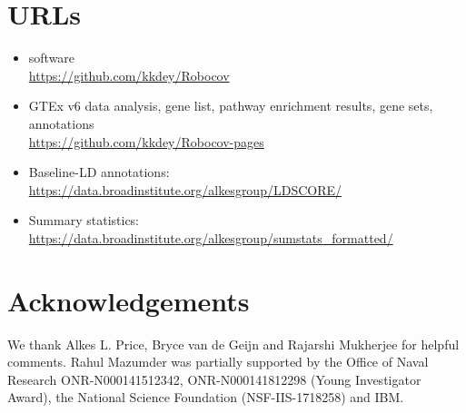 \section*{URLs}
\small
\begin{itemize}
    \item \Robocov{} software \\
    \url{https://github.com/kkdey/Robocov}
    \item GTEx v6 data analysis, gene list,
    pathway enrichment results, gene sets,
    annotations\\
    \url{https://github.com/kkdey/Robocov-pages}
    \item Baseline-LD annotations:\\ 
    \url{https://data.broadinstitute.org/alkesgroup/LDSCORE/}
    \item Summary statistics:\\ 
    \url{https://data.broadinstitute.org/alkesgroup/sumstats_formatted/}
\end{itemize}

\normalsize
\section*{Acknowledgements}

We thank Alkes L. Price, Bryce van de Geijn and Rajarshi Mukherjee for helpful comments. Rahul Mazumder was partially supported by 
the Office of Naval Research ONR-N000141512342, ONR-N000141812298 (Young Investigator Award), the National Science Foundation (NSF-IIS-1718258) and IBM.



